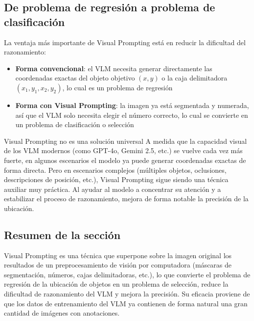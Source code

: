 \subsection{De problema de regresión a problema de clasificación}

La ventaja más importante de Visual Prompting está en reducir la dificultad del razonamiento:

\begin{itemize}
    \item \textbf{Forma convencional}: el VLM necesita generar directamente las coordenadas exactas del objeto objetivo $(x, y)$ o la caja delimitadora $(x_1, y_1, x_2, y_2)$, lo cual es un problema de regresión
    \item \textbf{Forma con Visual Prompting}: la imagen ya está segmentada y numerada, así que el VLM solo necesita elegir el número correcto, lo cual se convierte en un problema de clasificación o selección
\end{itemize}

\begin{warningbox}{Visual Prompting no es una solución universal}
A medida que la capacidad visual de los VLM modernos (como GPT-4o, Gemini 2.5, etc.) se vuelve cada vez más fuerte, en algunos escenarios el modelo ya puede generar coordenadas exactas de forma directa. Pero en escenarios complejos (múltiples objetos, oclusiones, descripciones de posición, etc.), Visual Prompting sigue siendo una técnica auxiliar muy práctica. Al ayudar al modelo a concentrar su atención y a estabilizar el proceso de razonamiento, mejora de forma notable la precisión de la ubicación.
\end{warningbox}

\subsection{Resumen de la sección}

Visual Prompting es una técnica que superpone sobre la imagen original los resultados de un preprocesamiento de visión por computadora (máscaras de segmentación, números, cajas delimitadoras, etc.), lo que convierte el problema de regresión de la ubicación de objetos en un problema de selección, reduce la dificultad de razonamiento del VLM y mejora la precisión. Su eficacia proviene de que los datos de entrenamiento del VLM ya contienen de forma natural una gran cantidad de imágenes con anotaciones.

